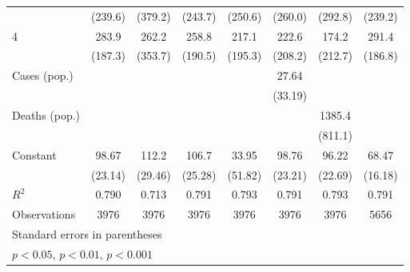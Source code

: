 \documentclass{article}
\begin{document}
{\begin{longtable}{l*{7}{c}}
                &  (239.6)         &  (379.2)         &  (243.7)         &  (250.6)         &  (260.0)         &  (292.8)         &  (239.2)         \\
4               &    283.9         &    262.2         &    258.8         &    217.1         &    222.6         &    174.2         &    291.4         \\
                &  (187.3)         &  (353.7)         &  (190.5)         &  (195.3)         &  (208.2)         &  (212.7)         &  (186.8)         \\
Cases (pop.)    &                  &                  &                  &                  &    27.64         &                  &                  \\
                &                  &                  &                  &                  &  (33.19)         &                  &                  \\
Deaths (pop.)   &                  &                  &                  &                  &                  &   1385.4         &                  \\
                &                  &                  &                  &                  &                  &  (811.1)         &                  \\
Constant        &    98.67\sym{***}&    112.2\sym{***}&    106.7\sym{***}&    33.95         &    98.76\sym{***}&    96.22\sym{***}&    68.47\sym{***}\\
                &  (23.14)         &  (29.46)         &  (25.28)         &  (51.82)         &  (23.21)         &  (22.69)         &  (16.18)         \\
\hline
\(R^{2}\)       &    0.790         &    0.713         &    0.791         &    0.793         &    0.791         &    0.793         &    0.791         \\
Observations    &     3976         &     3976         &     3976         &     3976         &     3976         &     3976         &     5656         \\
\hline\hline
\multicolumn{8}{l}{\footnotesize Standard errors in parentheses}\\
\multicolumn{8}{l}{\footnotesize \sym{*} \(p<0.05\), \sym{**} \(p<0.01\), \sym{***} \(p<0.001\)}\\
\end{longtable}
}
\end{document}

